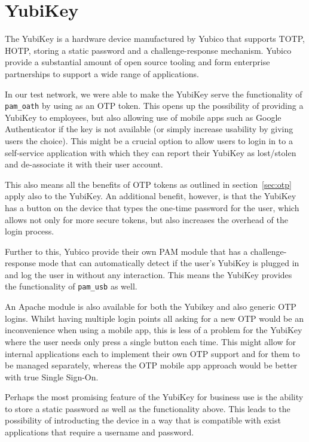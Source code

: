 \documentclass{report}
\begin{document}
\section{YubiKey}

The YubiKey \parencite{merkel2009yubikey} is a hardware device
manufactured by Yubico that supports TOTP, HOTP, storing a static password and
a challenge-response mechanism. Yubico provide a substantial amount of
open source tooling and form enterprise partnerships to support a wide
range of applications.

In our test network, we were able to make the YubiKey serve the functionality
of \texttt{pam\_oath} by using as an OTP token. This opens up the possibility
of providing a YubiKey to employees, but also allowing use of mobile apps
such as Google Authenticator if the key is not available (or simply increase
usability by giving users the choice). This might be a crucial option to
allow users to login in to a self-service application with which they can
report their YubiKey as lost/stolen and de-associate it with their user
account.

This also means all the benefits of OTP tokens as outlined in
section~\ref{sec:otp} apply also to the YubiKey. An additional benefit,
however, is that the YubiKey has a button on the device that types the
one-time password for the user, which allows not only for more secure tokens,
but also increases the overhead of the login process.

Further to this, Yubico provide their own PAM module that has a challenge-response
mode that can automatically detect if the user's YubiKey is plugged in
and log the user in without any interaction. This means the YubiKey provides
the functionality of \texttt{pam\_usb} as well.

An Apache module is also available
for both the Yubikey and also generic OTP logins. Whilst having multiple
login points all asking for a new OTP would be an inconvenience when using a mobile
app, this is less of a problem for the YubiKey where the user needs only press
a single button each time. This might allow for internal applications each to
implement their own OTP support and for them to be managed separately, whereas
the OTP mobile app approach would be better with true Single Sign-On.

Perhaps the most promising feature of the YubiKey for business use is the
ability to store a static password as well as the functionality above. This
leads to the possibility of introducting the device in a way that is
compatible with exist applications that require a username and password.
\end{document}
